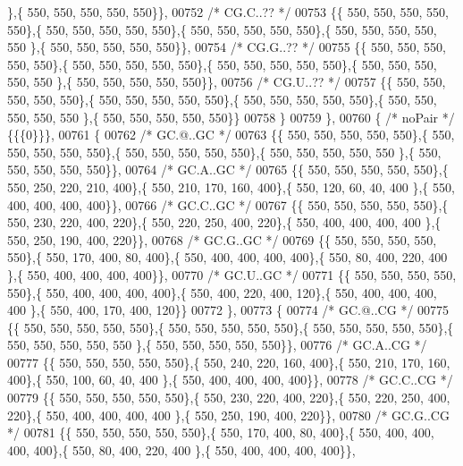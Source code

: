 \begin{DoxyCode}
      \},\{ 550, 550, 550, 550, 550\}\},
00752 \textcolor{comment}{/* CG.C..?? */}
00753 \{\{ 550, 550, 550, 550, 550\},\{ 550, 550, 550, 550, 550\},\{ 550, 550, 550, 550, 550\},\{ 550, 550, 550, 550, 550
      \},\{ 550, 550, 550, 550, 550\}\},
00754 \textcolor{comment}{/* CG.G..?? */}
00755 \{\{ 550, 550, 550, 550, 550\},\{ 550, 550, 550, 550, 550\},\{ 550, 550, 550, 550, 550\},\{ 550, 550, 550, 550, 550
      \},\{ 550, 550, 550, 550, 550\}\},
00756 \textcolor{comment}{/* CG.U..?? */}
00757 \{\{ 550, 550, 550, 550, 550\},\{ 550, 550, 550, 550, 550\},\{ 550, 550, 550, 550, 550\},\{ 550, 550, 550, 550, 550
      \},\{ 550, 550, 550, 550, 550\}\}
00758 \}
00759 \},
00760 \{ \textcolor{comment}{/* noPair */} \{\{\{0\}\}\},
00761 \{
00762 \textcolor{comment}{/* GC.@..GC */}
00763 \{\{ 550, 550, 550, 550, 550\},\{ 550, 550, 550, 550, 550\},\{ 550, 550, 550, 550, 550\},\{ 550, 550, 550, 550, 550
      \},\{ 550, 550, 550, 550, 550\}\},
00764 \textcolor{comment}{/* GC.A..GC */}
00765 \{\{ 550, 550, 550, 550, 550\},\{ 550, 250, 220, 210, 400\},\{ 550, 210, 170, 160, 400\},\{ 550, 120,  60,  40, 400
      \},\{ 550, 400, 400, 400, 400\}\},
00766 \textcolor{comment}{/* GC.C..GC */}
00767 \{\{ 550, 550, 550, 550, 550\},\{ 550, 230, 220, 400, 220\},\{ 550, 220, 250, 400, 220\},\{ 550, 400, 400, 400, 400
      \},\{ 550, 250, 190, 400, 220\}\},
00768 \textcolor{comment}{/* GC.G..GC */}
00769 \{\{ 550, 550, 550, 550, 550\},\{ 550, 170, 400,  80, 400\},\{ 550, 400, 400, 400, 400\},\{ 550,  80, 400, 220, 400
      \},\{ 550, 400, 400, 400, 400\}\},
00770 \textcolor{comment}{/* GC.U..GC */}
00771 \{\{ 550, 550, 550, 550, 550\},\{ 550, 400, 400, 400, 400\},\{ 550, 400, 220, 400, 120\},\{ 550, 400, 400, 400, 400
      \},\{ 550, 400, 170, 400, 120\}\}
00772 \},
00773 \{
00774 \textcolor{comment}{/* GC.@..CG */}
00775 \{\{ 550, 550, 550, 550, 550\},\{ 550, 550, 550, 550, 550\},\{ 550, 550, 550, 550, 550\},\{ 550, 550, 550, 550, 550
      \},\{ 550, 550, 550, 550, 550\}\},
00776 \textcolor{comment}{/* GC.A..CG */}
00777 \{\{ 550, 550, 550, 550, 550\},\{ 550, 240, 220, 160, 400\},\{ 550, 210, 170, 160, 400\},\{ 550, 100,  60,  40, 400
      \},\{ 550, 400, 400, 400, 400\}\},
00778 \textcolor{comment}{/* GC.C..CG */}
00779 \{\{ 550, 550, 550, 550, 550\},\{ 550, 230, 220, 400, 220\},\{ 550, 220, 250, 400, 220\},\{ 550, 400, 400, 400, 400
      \},\{ 550, 250, 190, 400, 220\}\},
00780 \textcolor{comment}{/* GC.G..CG */}
00781 \{\{ 550, 550, 550, 550, 550\},\{ 550, 170, 400,  80, 400\},\{ 550, 400, 400, 400, 400\},\{ 550,  80, 400, 220, 400
      \},\{ 550, 400, 400, 400, 400\}\},

\end{DoxyCode}

